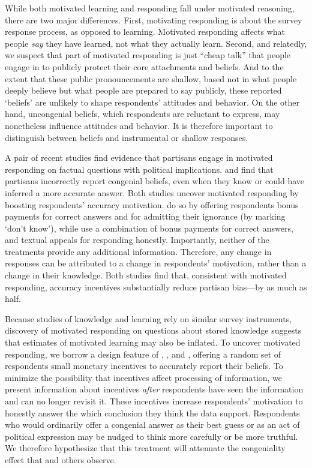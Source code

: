\documentclass[12pt, letterpaper]{article}
\begin{document}
While both motivated learning and responding fall under motivated reasoning, there are two major differences. First, motivating responding is about the survey response process, as opposed to learning. Motivated responding affects what people {\it say} they have learned, not what they actually learn. Second, and relatedly, we suspect that part of motivated responding is just ``cheap talk'' that people engage in to publicly protect their core attachments and beliefs. And to the extent that these public pronouncements are shallow, based not in what people deeply believe but what people are prepared to say publicly, these reported `beliefs' are unlikely to shape respondents' attitudes and behavior. On the other hand, uncongenial beliefs, which respondents are reluctant to express, may nonetheless influence attitudes and behavior. It is therefore important to distinguish between beliefs and instrumental or shallow responses.

A pair of recent studies find evidence that partisans engage in motivated responding on factual questions with political implications. \citet{bullock2015} and \citet{prior2015} find that partisans incorrectly report congenial beliefs, even when they know or could have inferred a more accurate answer. Both studies uncover motivated responding by boosting respondents' accuracy motivation. \citet{bullock2015} do so by offering respondents bonus payments for correct answers and for admitting their ignorance (by marking `don't know'), while \citet{prior2015} use a combination of bonus payments for correct answers, and textual appeals for responding honestly. Importantly, neither of the treatments provide any additional information. Therefore, any change in responses can be attributed to a change in respondents' motivation, rather than a change in their knowledge. Both studies find that, consistent with motivated responding, accuracy incentives substantially reduce partisan bias---by as much as half. 

Because studies of knowledge and learning rely on similar survey instruments, discovery of motivated responding on questions about stored knowledge suggests that estimates of motivated learning may also be inflated. To uncover motivated responding, we borrow a design feature of \citet{prior2008}, \citet{bullock2015}, and \citet{prior2015}, offering a random set of respondents small monetary incentives to accurately report their beliefs. To minimize the possibility that incentives affect processing of information, we present information about incentives \textit{after} respondents have seen the information and can no longer revisit it. These incentives increase respondents' motivation to honestly answer the which conclusion they think the data support. Respondents who would ordinarily offer a congenial answer as their best guess or as an act of political expression may be nudged to think more carefully or be more truthful. We therefore hypothesize that this treatment will attenuate the congeniality effect that \citet{kahan2017} and others observe.
\end{document}
